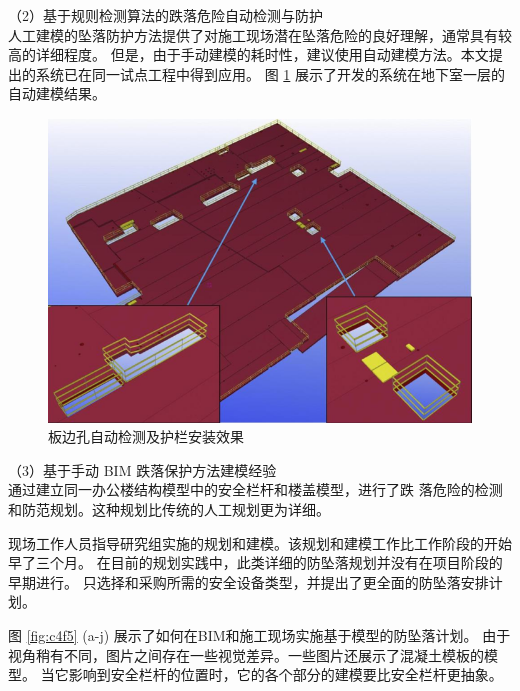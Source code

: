 （2）基于规则检测算法的跌落危险自动检测与防护\\

人工建模的坠落防护方法提供了对施工现场潜在坠落危险的良好理解，通常具有较高的详细程度。
但是，由于手动建模的耗时性，建议使用自动建模方法。本文提出的系统已在同一试点工程中得到应用。
图 \ref{fig:c4f4} 展示了开发的系统在地下室一层的自动建模结果。\\

\begin{figure}[thbp!]
    \centering
    \includegraphics[width=1.0\linewidth]{res/c4f4.png}
    \caption{板边孔自动检测及护栏安装效果}
    \label{fig:c4f4}
\end{figure}


（3）基于手动 BIM 跌落保护方法建模经验\\

通过建立同一办公楼结构模型中的安全栏杆和楼盖模型，进行了跌
落危险的检测和防范规划。这种规划比传统的人工规划更为详细。

现场工作人员指导研究组实施的规划和建模。该规划和建模工作比工作阶段的开始早了三个月。
在目前的规划实践中，此类详细的防坠落规划并没有在项目阶段的早期进行。
只选择和采购所需的安全设备类型，并提出了更全面的防坠落安排计划。

图 \ref{fig:c4f5} (a-j) 展示了如何在BIM和施工现场实施基于模型的防坠落计划。
由于视角稍有不同，图片之间存在一些视觉差异。一些图片还展示了混凝土模板的模型。
当它影响到安全栏杆的位置时，它的各个部分的建模要比安全栏杆更抽象。

